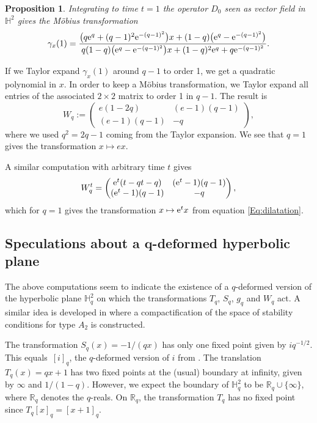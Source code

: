 \documentclass[pdftex]{sigma}
\numberwithin{equation}{section}
\newtheorem{Proposition}[Theorem]{Proposition}
 { \theoremstyle{definition}
\newtheorem{Definition}[Theorem]{Definition}
\newtheorem{Note}[Theorem]{Note}
\newtheorem{Example}[Theorem]{Example}
\newtheorem{Remark}[Theorem]{Remark} }
\newcommand*{\R}{\mathbb{R}}
\renewcommand*{\H}{\mathbb{H}}
\begin{document}
\begin{Proposition}
Integrating to time $t=1$ the operator $D_0$ seen as vector field in $\H^2$ gives the M\"obius transformation
\[
\gamma_x(1)=\frac{\big(q{\rm e}^q+(q-1)^2{\rm e}^{-(q-1)^2}\big)x+(1-q)\big({\rm e}^q-{\rm e}^{-(q-1)^2}\big)}{q(1-q)\big({\rm e}^q-{\rm e}^{-(q-1)^2}\big)x+(1-q)^2{\rm e}^q+q{\rm e}^{-(q-1)^2}}.
\]
\end{Proposition}

If we Taylor expand $\gamma_x(1)$ around $q-1$ to order 1, we get a quadratic polynomial in $x$. In order to keep a M\"obius transformation, we Taylor expand all entries of the associated $2\times 2$ matrix to order 1 in $q-1$. The result is
\[
W_q := \begin{pmatrix} e(1-2q) & (e-1)(q-1) \\ (e-1)(q-1) & -q\end{pmatrix},\]
where we used $q^2=2q-1$ coming from the Taylor expansion.
We see that $q=1$ gives the transformation $x\mapsto ex$.

A similar computation with arbitrary time $t$ gives
\[
W_q^t = \begin{pmatrix} {\rm e}^t(t-qt-q) & ({\rm e}^t-1)(q-1) \\ ({\rm e}^t-1)(q-1) & -q\end{pmatrix},
\]
which for $q=1$ gives the transformation $x\mapsto {\rm e}^t x$ from equation \eqref{Eq:dilatation}.

\subsection[Speculations about a q-deformed hyperbolic plane]{Speculations about a $\boldsymbol{q}$-deformed hyperbolic plane}

The above computations seem to indicate the existence of a $q$-deformed version of the hyperbolic plane $\H^2_q$ on which the transformations $T_q$, $S_q$, $g_q$ and $W_q$ act. A similar idea is developed in \cite{bapat2023q} where a compactification of the space of stability conditions for type $A_2$ is constructed.

The transformation $S_q(x)=-1/(qx)$ has only one fixed point given by $iq^{-1/2}$. This equals~$[i]_q$, the $q$-deformed version of $i$ from \cite[formula~(9)]{ovsienko2021towards}.
The translation $T_q(x)=qx+1$ has two fixed points at the (usual) boundary at infinity, given by $\infty$ and $1/(1-q)$. However, we expect the boundary of $\H^2_q$ to be $\R_q\cup \{\infty\}$, where $\R_q$ denotes the $q$-reals. On $\R_q$, the transformation $T_q$ has no fixed point since $T_q[x]_q=[x+1]_q$.
\end{document}
